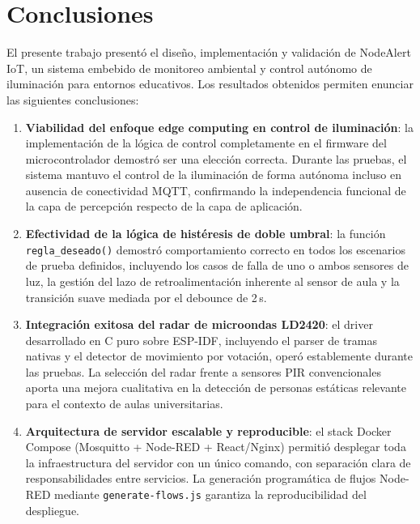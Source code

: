 
\section{Conclusiones}
\label{sec:conclusiones}

El presente trabajo presentó el diseño, implementación y validación de NodeAlert IoT,
un sistema embebido de monitoreo ambiental y control autónomo de iluminación para
entornos educativos. Los resultados obtenidos permiten enunciar las siguientes
conclusiones:

\begin{enumerate}
  \item \textbf{Viabilidad del enfoque edge computing en control de iluminación}:
        la implementación de la lógica de control completamente en el firmware del
        microcontrolador demostró ser una elección correcta. Durante las pruebas,
        el sistema mantuvo el control de la iluminación de forma autónoma incluso
        en ausencia de conectividad MQTT, confirmando la independencia funcional
        de la capa de percepción respecto de la capa de aplicación.

  \item \textbf{Efectividad de la lógica de histéresis de doble umbral}:
        la función \texttt{regla\_deseado()} demostró comportamiento correcto en
        todos los escenarios de prueba definidos, incluyendo los casos de falla
        de uno o ambos sensores de luz, la gestión del lazo de retroalimentación
        inherente al sensor de aula y la transición suave mediada por el debounce
        de 2\,s.

  \item \textbf{Integración exitosa del radar de microondas LD2420}:
        el driver desarrollado en C puro sobre ESP-IDF, incluyendo el parser de
        tramas nativas y el detector de movimiento por votación, operó
        establemente durante las pruebas. La selección del radar frente a sensores
        PIR convencionales aporta una mejora cualitativa en la detección de
        personas estáticas relevante para el contexto de aulas universitarias.

  \item \textbf{Arquitectura de servidor escalable y reproducible}:
        el stack Docker Compose (Mosquitto + Node-RED + React/Nginx) permitió
        desplegar toda la infraestructura del servidor con un único comando,
        con separación clara de responsabilidades entre servicios. La generación
        programática de flujos Node-RED mediante \texttt{generate-flows.js}
        garantiza la reproducibilidad del despliegue.


\end{enumerate}
